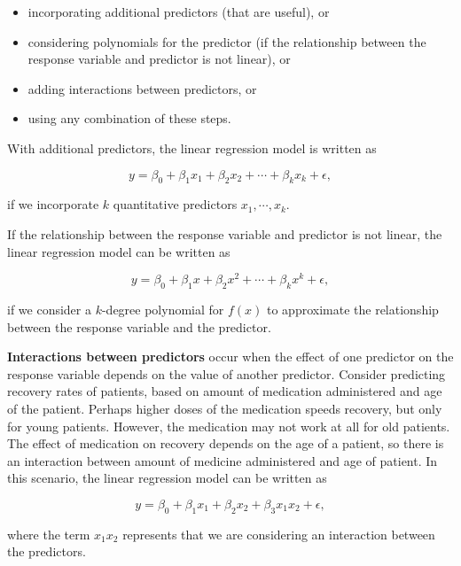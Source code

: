 \documentclass[
]{book}
\providecommand{\tightlist}{%
  \setlength{\itemsep}{0pt}\setlength{\parskip}{0pt}}
\begin{document}
\begin{itemize}
\tightlist
\item
  incorporating additional predictors (that are useful), or
\item
  considering polynomials for the predictor (if the relationship between the response variable and predictor is not linear), or
\item
  adding interactions between predictors, or
\item
  using any combination of these steps.
\end{itemize}

With additional predictors, the linear regression model is written as

\begin{equation} 
y=\beta_0+\beta_{1}x_1 + \beta_2 x_2 + \cdots + \beta_k x_k + \epsilon,
\label{eq:10-MLRmod}
\end{equation}

if we incorporate \(k\) quantitative predictors \(x_1, \cdots, x_k\).

If the relationship between the response variable and predictor is not linear, the linear regression model can be written as

\begin{equation} 
y=\beta_0+\beta_{1}x + \beta_2 x^2 + \cdots + \beta_k x^k + \epsilon,
\label{eq:10-polymod}
\end{equation}

if we consider a \(k\)-degree polynomial for \(f(x)\) to approximate the relationship between the response variable and the predictor.

\textbf{Interactions between predictors} occur when the effect of one predictor on the response variable depends on the value of another predictor. Consider predicting recovery rates of patients, based on amount of medication administered and age of the patient. Perhaps higher doses of the medication speeds recovery, but only for young patients. However, the medication may not work at all for old patients. The effect of medication on recovery depends on the age of a patient, so there is an interaction between amount of medicine administered and age of patient. In this scenario, the linear regression model can be written as

\begin{equation} 
y=\beta_0+\beta_{1}x_1 + \beta_2 x_2 + \beta_3 x_1 x_2 + \epsilon,
\label{eq:10-intmod}
\end{equation}

where the term \(x_1 x_2\) represents that we are considering an interaction between the predictors.
\end{document}
